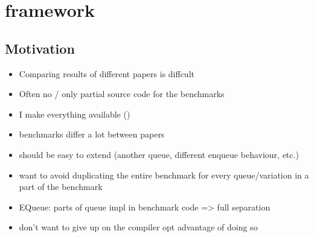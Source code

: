 \documentclass{article}
\begin{document}
\section{framework}
\subsection{Motivation}
\begin{itemize}
    \item Comparing results of different papers is diffcult
    \item Often no / only partial source code for the benchmarks
    \item I make everything available ()
    \item benchmarks differ a lot between papers

    \item should be easy to extend (another queue, different enqueue behaviour, etc.)
    \item want to avoid duplicating the entire benchmark for every queue/variation in a part of the benchmark
    \item EQueue: parts of queue impl in benchmark code => full separation
    \item don't want to give up on the compiler opt advantage of doing so
\end{itemize}
\end{document}
